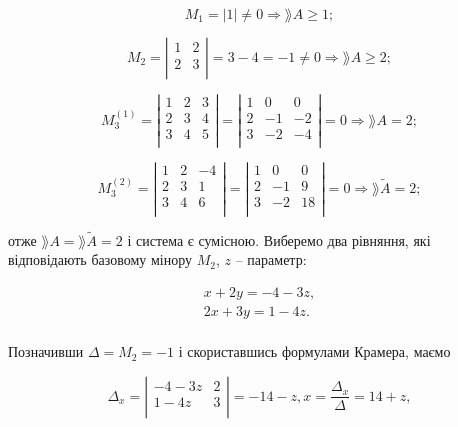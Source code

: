 $$M_1 = |1| \neq 0 \Rightarrow \rang A \geqslant 1;$$

$$M_2 = \left| \begin{matrix}
	1 & 2 \\
	2 & 3 \\
\end{matrix} \right| = 3 - 4 = -1 \neq 0 \Rightarrow \rang A \geqslant 2;$$

$$M_3^{(1)} = \left| \begin{matrix}
	1 & 2 & 3 \\
	2 & 3 & 4 \\
	3 & 4 & 5 \\
\end{matrix} \right| = \left| \begin{matrix}
	1 &  0 &  0 \\
	2 & -1 & -2 \\
	3 & -2 & -4 \\
\end{matrix} \right| = 0 \Rightarrow \rang A = 2;$$

$$M_3^{(2)} = \left| \begin{matrix}
	1 & 2 & -4 \\
	2 & 3 & 1 \\
	3 & 4 & 6 \\
\end{matrix} \right| = \left| \begin{matrix}
	1 &  0 &  0 \\
	2 & -1 &  9 \\
	3 & -2 & 18 \\
\end{matrix} \right| = 0 \Rightarrow \rang \tilde{A} = 2;$$


отже $\rang A = \rang \tilde{A} = 2$ і система є сумісною. Виберемо два рівняння, які
відповідають базовому мінору $M_2$, $z$ -- параметр:

$$\begin{matrix}
	x + 2y = -4 -3z, \\
	2x + 3y = 1 -4z. \\
\end{matrix}$$

Позначивши $\Delta = M_2 = -1$ і скориставшись формулами Крамера, маємо

$$\Delta_x = \left| \begin{matrix}
	-4 -3z & 2 \\
	 1 -4z & 3 \\
\end{matrix} \right| = -14 -z, x = \dfrac{\Delta_x}{\Delta} = 14 + z,$$

